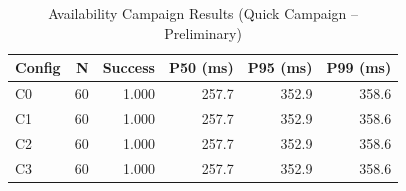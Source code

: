 \begin{table}[htbp]
\caption{Availability Campaign Results (Quick Campaign -- Preliminary)}
\label{tab:availability-results}
\centering
\small
\begin{tabular}{lrrrrr}
\toprule
\textbf{Config} & \textbf{N} & \textbf{Success} & \textbf{P50 (ms)} & \textbf{P95 (ms)} & \textbf{P99 (ms)} \\
\midrule
  C0 & 60 & 1.000 & 257.7 & 352.9 & 358.6 \\
  C1 & 60 & 1.000 & 257.7 & 352.9 & 358.6 \\
  C2 & 60 & 1.000 & 257.7 & 352.9 & 358.6 \\
  C3 & 60 & 1.000 & 257.7 & 352.9 & 358.6 \\
\bottomrule
\end{tabular}
\end{table}